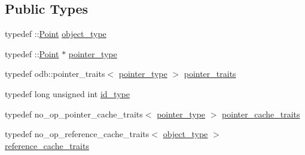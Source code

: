 \subsection*{Public Types}
\begin{DoxyCompactItemize}
\item 
typedef \+::\hyperlink{class_point}{Point} \hyperlink{classodb_1_1access_1_1object__traits_3_01_1_1_point_01_4_ae04031244a1864e5bcd0585ec7b4a59b}{object\+\_\+type}
\item 
typedef \+::\hyperlink{class_point}{Point} $\ast$ \hyperlink{classodb_1_1access_1_1object__traits_3_01_1_1_point_01_4_af346f01f87941f322ac52af87a7b64bb}{pointer\+\_\+type}
\item 
typedef odb\+::pointer\+\_\+traits$<$ \hyperlink{classodb_1_1access_1_1object__traits_3_01_1_1_point_01_4_af346f01f87941f322ac52af87a7b64bb}{pointer\+\_\+type} $>$ \hyperlink{classodb_1_1access_1_1object__traits_3_01_1_1_point_01_4_ad0c4599941aa4675b6d489b2d88f31a2}{pointer\+\_\+traits}
\item 
typedef long unsigned int \hyperlink{classodb_1_1access_1_1object__traits_3_01_1_1_point_01_4_a179554b6e342dd4a39a1d3fb4d4632fe}{id\+\_\+type}
\item 
typedef no\+\_\+op\+\_\+pointer\+\_\+cache\+\_\+traits$<$ \hyperlink{classodb_1_1access_1_1object__traits_3_01_1_1_point_01_4_af346f01f87941f322ac52af87a7b64bb}{pointer\+\_\+type} $>$ \hyperlink{classodb_1_1access_1_1object__traits_3_01_1_1_point_01_4_ab96e4f735dbd7dd9cc77e0180f959ccb}{pointer\+\_\+cache\+\_\+traits}
\item 
typedef no\+\_\+op\+\_\+reference\+\_\+cache\+\_\+traits$<$ \hyperlink{classodb_1_1access_1_1object__traits_3_01_1_1_point_01_4_ae04031244a1864e5bcd0585ec7b4a59b}{object\+\_\+type} $>$ \hyperlink{classodb_1_1access_1_1object__traits_3_01_1_1_point_01_4_a0ee5afc48c297c3b21cfb6c214267714}{reference\+\_\+cache\+\_\+traits}
\end{DoxyCompactItemize}
